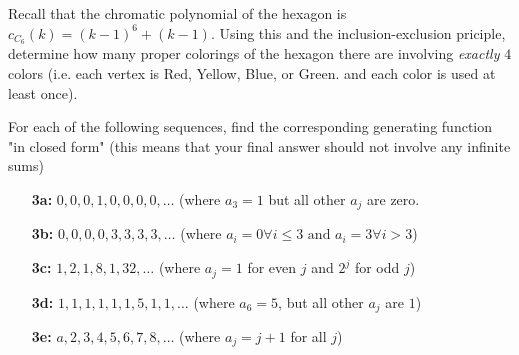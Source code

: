 \documentclass[12pt]{amsart}
\begin{document}
\begin{problem}

Recall that the chromatic polynomial of the hexagon is $c_{C_6}(k)=(k-1)^6+(k-1)$. Using this and the inclusion-exclusion priciple, determine how many proper colorings of the hexagon there are involving \textit{exactly} $4$ colors (i.e. each vertex is Red, Yellow, Blue, or Green. and each color is used at least once).
\end{problem}
\begin{solution}

\end{solution}


\begin{problem}
For each of the following sequences, find the corresponding generating function "in closed form" (this means that your final answer should not involve any infinite sums)
\begin{itemize}
	\item[\textbf{3a:}] $0,0,0,1,0,0,0,0,\dots$ (where $a_3=1$ but all other $a_j$ are zero.
	\item[\textbf{3b:}] $0,0,0,0,3,3,3,3,\dots$ (where $a_i=0 \forall i \leq 3 \text{ and } a_i=3 \forall i >3$)
	\item[\textbf{3c:}] $1,2,1,8,1,32,\dots$ (where $a_j=1$ for even $j$ and $2^j$ for odd $j$)
	\item[\textbf{3d:}] $1,1,1,1,1,1,5,1,1,\dots$ (where $a_6=5$, but all other $a_j$ are $1$)
	\item[\textbf{3e:}] $a,2,3,4,5,6,7,8,\dots$ (where $a_j=j+1$ for all $j$)
\end{itemize}
\end{problem}
\begin{solution}

\end{solution}

\end{document}

